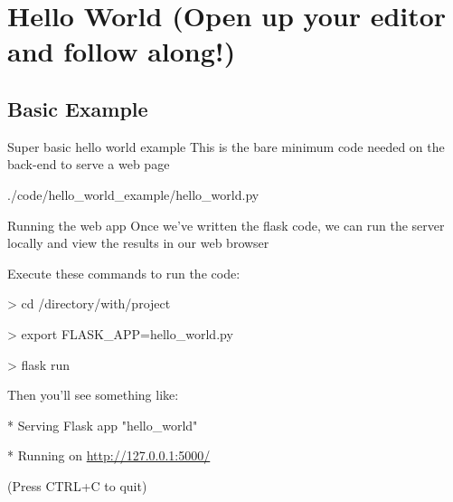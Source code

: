 \documentclass{beamer}
\begin{document}
\section[Hello World]{Hello World \newline (Open up your editor and follow along!)}

\subsection{Basic Example}
	\begin{frame}[t]{Super basic hello world example}
		This is the bare minimum code needed on the back-end to serve a web
		page
		\begin{block}{./code/hello\_world\_example/hello\_world.py}
			
		\end{block}
	\end{frame}


	\begin{frame}[t]{Running the web app}
		Once we've written the flask code, we can run the server locally and
		view the results in our web browser
		\pause

		\begin{block}{Execute these commands to run the code:}
			\begin{semiverbatim}
				> cd /directory/with/project

				> export FLASK\_APP=hello\_world.py

				> flask run
			\end{semiverbatim}
		\end{block}
		\pause

		\begin{block}{Then you'll see something like:}
			\begin{semiverbatim}
				* Serving Flask app "hello\_world"

				* Running on \url{http://127.0.0.1:5000/}

					(Press CTRL+C to quit)
			\end{semiverbatim}
		\end{block}
	\end{frame}
\end{document}
